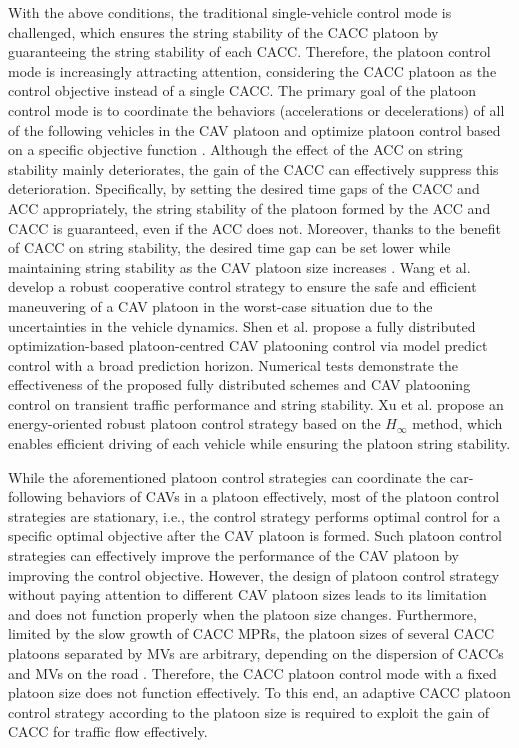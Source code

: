 \documentclass[journal]{IEEEtran}
\begin{document}
With the above conditions, the traditional single-vehicle control mode is challenged, which ensures the string stability of the CACC platoon by guaranteeing the string stability of each CACC. Therefore, the platoon control mode is increasingly attracting attention, considering the CACC platoon as the control objective instead of a single CACC. The primary goal of the platoon control mode is to coordinate the behaviors (accelerations or decelerations) of all of the following vehicles in the CAV platoon and optimize platoon control based on a specific objective function \citep{Wang2022a,Shen2021,Xu2019a}. Although the effect of the ACC on string stability mainly deteriorates, the gain of the CACC can effectively suppress this deterioration. Specifically, by setting the desired time gaps of the CACC and ACC appropriately, the string stability of the platoon formed by the ACC and CACC is guaranteed, even if the ACC does not. Moreover, thanks to the benefit of CACC on string stability, the desired time gap can be set lower while maintaining string stability as the CAV platoon size increases \citep{Qin2021b}. Wang et al. \citep{Wang2022a} develop a robust cooperative control strategy to ensure the safe and efficient maneuvering of a CAV platoon in the worst-case situation due to the uncertainties in the vehicle dynamics. Shen et al. \citep{Shen2021} propose a fully distributed optimization-based platoon-centred CAV platooning control via model predict control with a broad prediction horizon. Numerical tests demonstrate the effectiveness of the proposed fully distributed schemes and CAV platooning control on transient traffic performance and string stability. Xu et al. \citep{Xu2019a} propose an energy-oriented robust platoon control strategy based on the $H_{\infty}$ method, which enables efficient driving of each vehicle while ensuring the platoon string stability.

While the aforementioned platoon control strategies can coordinate the car-following behaviors of CAVs in a platoon effectively, most of the platoon control strategies are stationary, i.e., the control strategy performs optimal control for a specific optimal objective after the CAV platoon is formed. Such platoon control strategies can effectively improve the performance of the CAV platoon by improving the control objective. However, the design of platoon control strategy without paying attention to different CAV platoon sizes leads to its limitation and does not function properly when the platoon size changes. Furthermore, limited by the slow growth of CACC MPRs, the platoon sizes of several CACC platoons separated by MVs are arbitrary, depending on the dispersion of CACCs and MVs on the road \citep{zhou2020stabilizing}. Therefore, the CACC platoon control mode with a fixed platoon size does not function effectively. To this end, an adaptive CACC platoon control strategy according to the platoon size is required to exploit the gain of CACC for traffic flow effectively.
\end{document}

